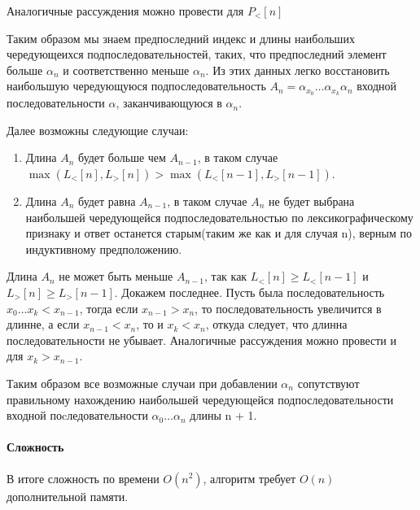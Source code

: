 \documentclass[12pt]{article}
\begin{document}
Аналогичные рассуждения можно провести для $ P_<[n] $

Таким образом мы знаем предпоследний индекс и длины наибольших чередующеихся подпоследовательностей,
таких, что предпоследний элемент больше $\alpha_n$ и соответственно меньше $\alpha_n$. Из этих данных
легко восстановить наибольшую чередующуюся подпоследовательность $ A_n = \alpha_{x_0} \dots \alpha_{x_k} \alpha_n $
входной последовательности $ \alpha $, заканчивающуюся в $ \alpha_n $.

Далее возможны следующие случаи:
\begin{enumerate}
    \item Длина $ A_n $ будет больше чем $ A_{n - 1} $, в таком случае 
    $ \max(L_<[n], L_>[n]) > \max(L_<[n-1],L_>[n-1]) $. 

    \item Длина $ A_n $ будет равна $ A_{n-1} $, в таком случае $ A_n $
    не будет выбрана наибольшей чередующейся подпоследовательностью по
    лексикографическому признаку и ответ останется старым(таким же как и
    для случая n), верным по индуктивному предположению.
\end{enumerate}

Длина $ A_n $ не может быть меньше $ A_{n - 1} $, так как $ L_<[n] \ge L_<[n - 1] $ и $ L_>[n] \ge L_>[n - 1] $. 
Докажем последнее. Пусть была последовательность $ x_0 \dots x_k < x_{n - 1}$, тогда если $ x_{n - 1} > x_{n} $,
то последовательность увеличится в длинне, а если $ x_{n - 1} < x_n $, то и $ x_k < x_n $, откуда следует, что
длинна последовательности не убывает. Аналогичные рассуждения можно провести и для $ x_k > x_{n - 1} $.

Таким образом все возможные случаи при добавлении $ \alpha_n $ сопутствуют правильному нахождению
наибольшей чередующейся подпоследовательности входной поcледовательности $ \alpha_0 \dots \alpha_n $ длины n + 1.




\paragraph{Сложность}
В итоге сложность по времени $ O(n^2) $, алгоритм требует $ O(n) $ дополнительной памяти.
\end{document}
